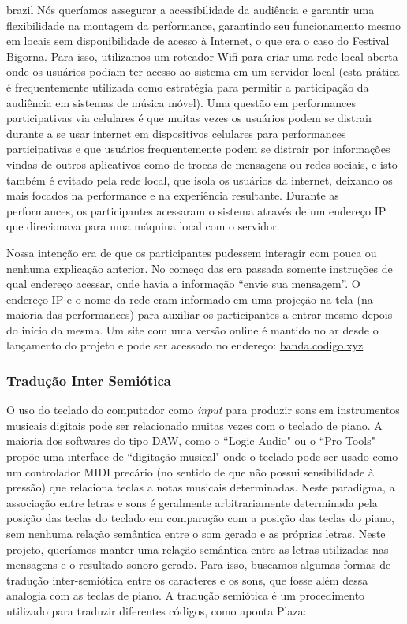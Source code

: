 \begin{otherlanguage*}{brazil}
Nós queríamos assegurar a acessibilidade da audiência e garantir uma flexibilidade na montagem da performance, garantindo seu funcionamento mesmo em locais sem disponibilidade de acesso à Internet, o que era o caso do Festival Bigorna. Para isso, utilizamos um roteador Wifi para criar uma rede local aberta onde os usuários podiam ter acesso ao sistema em um servidor local (esta prática é frequentemente utilizada como estratégia para permitir a participação da audiência em sistemas de música móvel\cite{Lambert:2016}). Uma questão em performances participativas via celulares é que muitas vezes os usuários podem se distrair durante a se usar internet em dispositivos celulares para performances participativas e que usuários frequentemente podem se distrair por informações vindas de outros aplicativos como de trocas de mensagens ou redes sociais\cite{wu2017open}, e isto também é evitado pela rede local, que isola os usuários da internet, deixando os mais focados na performance e na experiência resultante. Durante as performances, os participantes acessaram o sistema através de um endereço IP que direcionava para uma máquina local com o servidor.

Nossa intenção era de que os participantes pudessem interagir com pouca ou nenhuma explicação anterior. No começo das era passada somente instruções de qual endereço acessar, onde havia a informação ``envie sua mensagem''. O endereço IP e o nome da rede eram informado em uma projeção na tela (na maioria das performances) para auxiliar os participantes a entrar mesmo depois do início da mesma. Um site com uma versão online é mantido no ar desde o lançamento do projeto e pode ser acessado no endereço: \url{banda.codigo.xyz}




\subsubsection{Tradução Inter Semiótica}
\label{sec:trad}

O uso do teclado do computador como \emph{input} para produzir sons em instrumentos musicais digitais pode ser relacionado muitas vezes com o teclado de piano. A maioria dos softwares do tipo DAW, como o ``Logic Audio" ou o ``Pro Tools" propõe uma interface de ``digitação musical" onde o teclado pode ser usado como um controlador MIDI precário (no sentido de que não possui sensibilidade à pressão) que relaciona teclas a notas musicais determinadas. Neste paradigma, a associação entre letras e sons é geralmente arbitrariamente determinada pela posição das teclas do teclado em comparação com a posição das teclas do piano, sem nenhuma relação semântica entre o som gerado e as próprias letras. Neste projeto, queríamos manter uma relação semântica entre as letras utilizadas nas mensagens e o resultado sonoro gerado. Para isso, buscamos algumas formas de tradução inter-semiótica entre os caracteres e os sons, que fosse além dessa analogia com as teclas de piano. A tradução semiótica é um procedimento utilizado para traduzir diferentes códigos, como aponta Plaza: 


\end{otherlanguage*}
